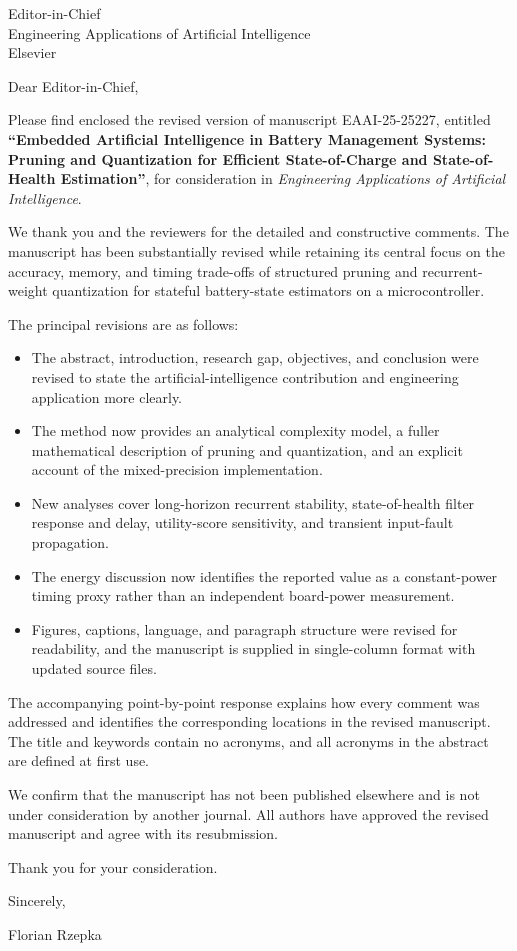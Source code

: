 \documentclass[11pt]{letter}
\date{\today}
\begin{document}
\begin{letter}{Editor-in-Chief\\
Engineering Applications of Artificial Intelligence\\
Elsevier}

\opening{Dear Editor-in-Chief,}

Please find enclosed the revised version of manuscript EAAI-25-25227, entitled \textbf{``Embedded Artificial Intelligence in Battery Management Systems: Pruning and Quantization for Efficient State-of-Charge and State-of-Health Estimation''}, for consideration in \textit{Engineering Applications of Artificial Intelligence}.

We thank you and the reviewers for the detailed and constructive comments. The manuscript has been substantially revised while retaining its central focus on the accuracy, memory, and timing trade-offs of structured pruning and recurrent-weight quantization for stateful battery-state estimators on a microcontroller.

The principal revisions are as follows:
\begin{itemize}
    \item The abstract, introduction, research gap, objectives, and conclusion were revised to state the artificial-intelligence contribution and engineering application more clearly.
    \item The method now provides an analytical complexity model, a fuller mathematical description of pruning and quantization, and an explicit account of the mixed-precision implementation.
    \item New analyses cover long-horizon recurrent stability, state-of-health filter response and delay, utility-score sensitivity, and transient input-fault propagation.
    \item The energy discussion now identifies the reported value as a constant-power timing proxy rather than an independent board-power measurement.
    \item Figures, captions, language, and paragraph structure were revised for readability, and the manuscript is supplied in single-column format with updated source files.
\end{itemize}

The accompanying point-by-point response explains how every comment was addressed and identifies the corresponding locations in the revised manuscript. The title and keywords contain no acronyms, and all acronyms in the abstract are defined at first use.

We confirm that the manuscript has not been published elsewhere and is not under consideration by another journal. All authors have approved the revised manuscript and agree with its resubmission.

Thank you for your consideration.

Sincerely,

Florian Rzepka
\end{letter}
\end{document}
